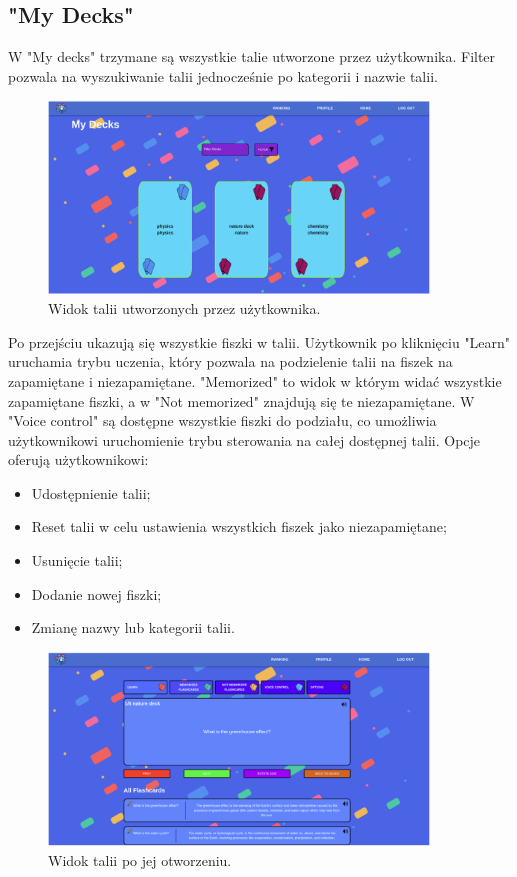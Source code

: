 \subsection{"My Decks"}
W "My decks" trzymane są wszystkie talie utworzone przez użytkownika. Filter pozwala na wyszukiwanie talii jednocześnie po kategorii i nazwie talii.


\begin{figure}[H]
    \centering
    \includegraphics[width=0.9\textwidth]{chapters/chapter_10/images_web/web_my_decks}
    \caption{Widok talii utworzonych przez użytkownika.}
    \label{img:web_my_decks}
\end{figure}


Po przejściu ukazują się wszystkie fiszki w talii. Użytkownik po kliknięciu "Learn" uruchamia trybu uczenia, który pozwala na podzielenie talii na fiszek na zapamiętane i niezapamiętane. "Memorized" to widok w którym widać wszystkie zapamiętane fiszki, a w "Not memorized" znajdują się te niezapamiętane. W "Voice control" są dostępne wszystkie fiszki do podziału, co umożliwia użytkownikowi uruchomienie trybu sterowania na całej dostępnej talii. Opcje oferują użytkownikowi:


\begin{itemize}
    \item Udostępnienie talii;
    \item Reset talii w celu ustawienia wszystkich fiszek jako niezapamiętane;
    \item Usunięcie talii;
    \item Dodanie nowej fiszki;
    \item Zmianę nazwy lub kategorii talii.
\end{itemize}


\begin{figure}[H]
    \centering
    \includegraphics[width=0.9\textwidth]{chapters/chapter_10/images_web/web_deck}
    \caption{Widok talii po jej otworzeniu.}
    \label{img:web_deck}
\end{figure}


